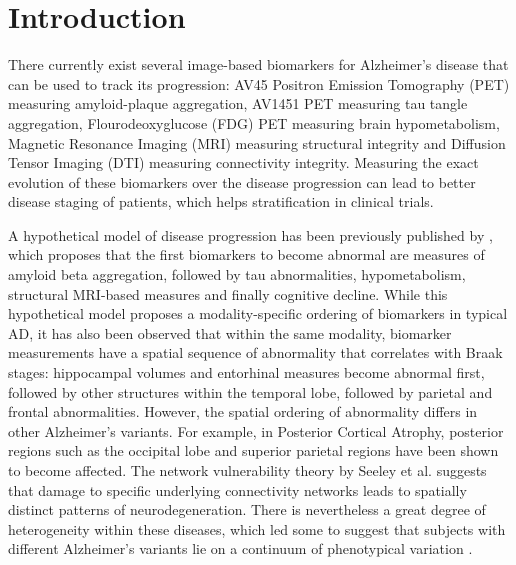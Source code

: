 \documentclass{llncs}
\begin{document}
\section{Introduction}


There currently exist several image-based biomarkers for Alzheimer's disease that can be used to track its progression: AV45 Positron Emission Tomography (PET) measuring amyloid-plaque aggregation, AV1451 PET measuring tau tangle aggregation, Flourodeoxyglucose (FDG) PET measuring brain hypometabolism, Magnetic Resonance Imaging (MRI) measuring structural integrity and Diffusion Tensor Imaging (DTI) measuring connectivity integrity. Measuring the exact evolution of these biomarkers over the disease progression can lead to better disease staging of patients, which helps stratification in clinical trials.


A hypothetical model of disease progression has been previously published by \cite{jack2010hypothetical}, which proposes that the first biomarkers to become abnormal are measures of amyloid beta aggregation, followed by tau abnormalities, hypometabolism, structural MRI-based measures and finally cognitive decline. While this hypothetical model proposes a modality-specific ordering of biomarkers in typical AD, it has also been observed that within the same modality, biomarker measurements have a spatial sequence of abnormality that correlates with Braak stages: hippocampal volumes and entorhinal measures become abnormal first, followed by other structures within the temporal lobe, followed by parietal and frontal abnormalities. However, the spatial ordering of abnormality differs in other Alzheimer's variants. For example, in Posterior Cortical Atrophy, posterior regions such as the occipital lobe and superior parietal regions have been shown to become affected. The network vulnerability theory by Seeley et al. \cite{seeley2009neurodegenerative} suggests that damage to specific underlying connectivity networks leads to spatially distinct patterns of neurodegeneration. There is nevertheless a great degree of heterogeneity within these diseases, which led some to suggest that subjects with different Alzheimer's variants lie on a continuum of phenotypical variation \cite{crutch2012posterior}. 
% 
% 
\end{document}
